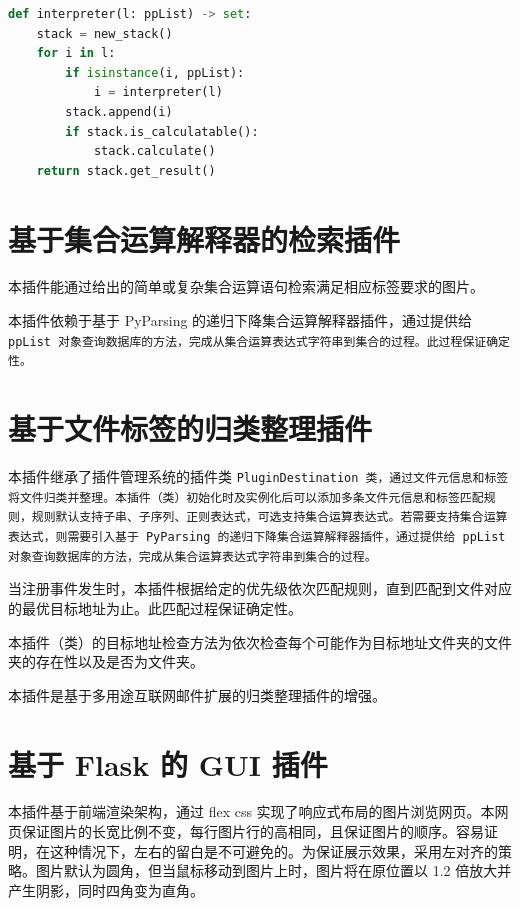 \begin{lstlisting}[language=Python]
def interpreter(l: ppList) -> set:
    stack = new_stack()
    for i in l:
        if isinstance(i, ppList):
            i = interpreter(l)
        stack.append(i)
        if stack.is_calculatable():
            stack.calculate()
    return stack.get_result()
\end{lstlisting}

\section{基于集合运算解释器的检索插件}

本插件能通过给出的简单或复杂集合运算语句检索满足相应标签要求的图片。

本插件依赖于基于 PyParsing 的递归下降集合运算解释器插件，通过提供给 \tt{ppList} 对象查询数据库的方法，完成从集合运算表达式字符串到集合的过程。此过程保证确定性。

\section{基于文件标签的归类整理插件}

本插件继承了插件管理系统的插件类 \tt{PluginDestination} 类，通过文件元信息和标签将文件归类并整理。本插件（类）初始化时及实例化后可以添加多条文件元信息和标签匹配规则，规则默认支持子串、子序列、正则表达式，可选支持集合运算表达式。若需要支持集合运算表达式，则需要引入基于 PyParsing 的递归下降集合运算解释器插件，通过提供给 \tt{ppList} 对象查询数据库的方法，完成从集合运算表达式字符串到集合的过程。

当注册事件发生时，本插件根据给定的优先级依次匹配规则，直到匹配到文件对应的最优目标地址为止。此匹配过程保证确定性。

本插件（类）的目标地址检查方法为依次检查每个可能作为目标地址文件夹的文件夹的存在性以及是否为文件夹。

本插件是基于多用途互联网邮件扩展的归类整理插件的增强。

\section{基于 Flask 的 GUI 插件}

本插件基于前端渲染架构，通过 flex css 实现了响应式布局的图片浏览网页。本网页保证图片的长宽比例不变，每行图片行的高相同，且保证图片的顺序。容易证明，在这种情况下，左右的留白是不可避免的。为保证展示效果，采用左对齐的策略。图片默认为圆角，但当鼠标移动到图片上时，图片将在原位置以 1.2 倍放大并产生阴影，同时四角变为直角。

